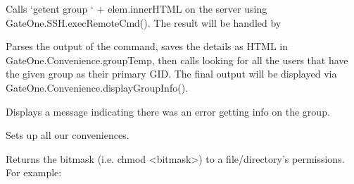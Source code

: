 \documentclass[letterpaper,10pt,openany]{sphinxmanual}
\begin{document}
\begin{fulllineitems}
\begin{fulllineitems}
\end{fulllineitems}



\begin{fulllineitems}
\label{Applications/terminal/plugin_convenience:GateOne.Convenience.groupInfo}
Calls `getent group ` + elem.innerHTML on the server using GateOne.SSH.execRemoteCmd().  The result will be handled by 

\end{fulllineitems}



\begin{fulllineitems}
\label{Applications/terminal/plugin_convenience:GateOne.Convenience.groupInfo2}
Parses the output of the  command, saves the details as HTML in GateOne.Convenience.groupTemp, then calls  looking for all the users that have the given group as their primary GID.  The final output will be displayed via GateOne.Convenience.displayGroupInfo().

\end{fulllineitems}



\begin{fulllineitems}
\label{Applications/terminal/plugin_convenience:GateOne.Convenience.groupInfoError}
Displays a message indicating there was an error getting info on the group.

\end{fulllineitems}



\begin{fulllineitems}
\label{Applications/terminal/plugin_convenience:GateOne.Convenience.init}
Sets up all our conveniences.

\end{fulllineitems}



\begin{fulllineitems}
\label{Applications/terminal/plugin_convenience:GateOne.Convenience.permissionsBitmask}
Returns the bitmask (i.e. chmod \textless{}bitmask\textgreater{}) to a file/directory's permissions.  For example:


\end{fulllineitems}
\end{fulllineitems}
\end{document}
